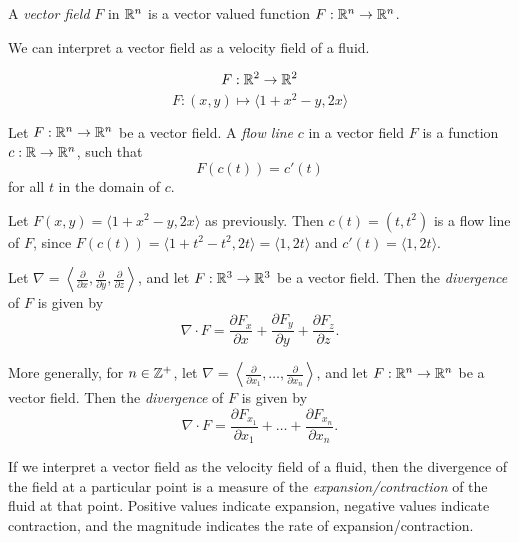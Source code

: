\begin{defn}
    A \emph{vector field} $F$ in $\mathbb{R}^n$ is a vector valued function $F: \mathbb{R}^n \to \mathbb{R}^n$.
\end{defn}

\begin{rmk}
    We can interpret a vector field as a velocity field of a fluid.
\end{rmk}

\begin{exmp}
    \[F: \mathbb{R}^2 \to \mathbb{R}^2\]
    \[F: (x, y) \mapsto \langle 1 + x^2 - y, 2x\rangle \]
\end{exmp}

\begin{defn}
    Let $F: \mathbb{R}^n \to \mathbb{R}^n$ be a vector field. A \emph{flow line} $c$ in a vector field $F$ is a function $c: \mathbb{R} \to \mathbb{R}^n$, such that \[F(c(t)) = c'(t)\] for all $t$ in the domain of $c$.
\end{defn}

\begin{exmp}
    Let $F(x, y) = \langle 1 + x^2 - y, 2x\rangle$ as previously. Then $c(t) = (t, t^2)$ is a flow line of $F$, since $F(c(t)) = \langle 1 + t^2 - t^2, 2t\rangle = \langle 1, 2t\rangle$ and $c'(t) = \langle 1, 2t\rangle$.
\end{exmp}

\begin{defn}
    Let $\nabla = \left\langle \frac{\partial}{\partial{x}}, \frac{\partial}{\partial{y}}, \frac{\partial}{\partial{z}} \right\rangle$, and let $F:\mathbb{R}^3 \to \mathbb{R}^3$ be a vector field. Then the \emph{divergence} of $F$ is given by \[\nabla \cdot F = \frac{\partial{F_x}}{\partial{x}} + \frac{\partial{F_y}}{\partial{y}} + \frac{\partial{F_z}}{\partial{z}}.\]
\end{defn}

\begin{defn}
    More generally, for $n \in \mathbb{Z}^+$, let $\nabla = \left\langle \frac{\partial}{\partial{x_1}}, \ldots, \frac{\partial}{\partial{x_n}} \right\rangle$, and let $F:\mathbb{R}^n \to \mathbb{R}^n$ be a vector field. Then the \emph{divergence} of $F$ is given by \[\nabla \cdot F = \frac{\partial{F_{x_1}}}{\partial{x_1}} + \ldots + \frac{\partial{F_{x_n}}}{\partial{x_n}}.\]
\end{defn}

\begin{rmk}
    If we interpret a vector field as the velocity field of a fluid, then the divergence of the field at a particular point is a measure of the \emph{expansion/contraction} of the fluid at that point. Positive values indicate expansion, negative values indicate contraction, and the magnitude indicates the rate of expansion/contraction.
\end{rmk}

